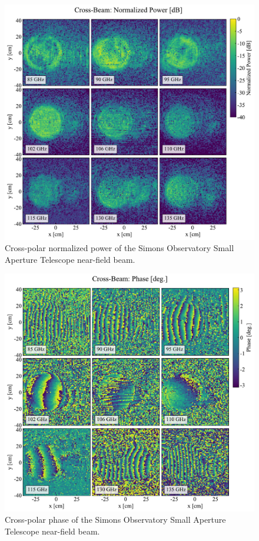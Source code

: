 \begin{figure}
    \centering
    \includegraphics[width = \textwidth]{Figures/SAT_MF1_cr-beam.pdf}
    \caption{Cross-polar normalized power of the Simons Observatory Small Aperture Telescope near-field beam.}
    \label{fig:sat_mf_crbeam}
\end{figure}

\begin{figure}
    \centering
    \includegraphics[width = \textwidth]{Figures/SAT_MF1_cr-phase.pdf}
    \caption{Cross-polar phase of the Simons Observatory Small Aperture Telescope near-field beam.}
    \label{fig:sat_mf_crphase}
\end{figure}
